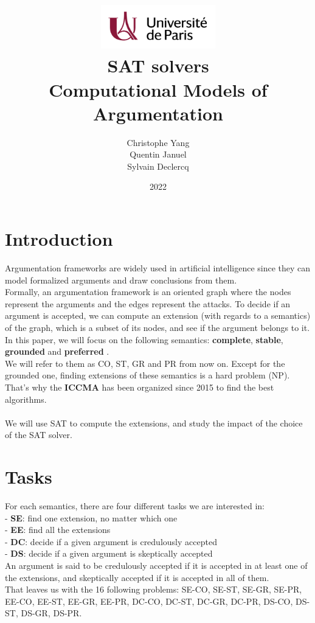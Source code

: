 \documentclass[11pt]{article}
\title{
	\centering
	\includegraphics[width=5cm]{univ-logo} \\
	\vspace{5cm}
	\textbf{SAT solvers} \\
	Computational Models of Argumentation
	\vspace{5cm}
}
\author{
    Christophe Yang \\
    Quentin Januel \\
    Sylvain Declercq
}
\date{2022}
\begin{document}
\maketitle
\newpage

\section{Introduction}
Argumentation frameworks are widely used in artificial intelligence since they can model formalized arguments and draw conclusions from them. \\
Formally, an argumentation framework is an oriented graph where the nodes represent the arguments and the edges represent the attacks. To decide if an argument is accepted, we can compute an extension (with regards to a semantics) of the graph, which is a subset of its nodes, and see if the argument belongs to it. \\
In this paper, we will focus on the following semantics: \textbf{complete}, \textbf{stable}, \textbf{grounded} and \textbf{preferred} \cite{dung1995acceptability}. \\
We will refer to them as CO, ST, GR and PR from now on.
Except for the grounded one, finding extensions of these semantics is a hard problem (NP). That's why the \textbf{ICCMA}\cite{iccma} has been organized since 2015 to find the best algorithms. \\ \\
We will use SAT to compute the extensions, and study the impact of the choice of the SAT solver.

\section{Tasks}
For each semantics, there are four different tasks we are interested in: \\
 - \textbf{SE}: find one extension, no matter which one \\
 - \textbf{EE}: find all the extensions \\
 - \textbf{DC}: decide if a given argument is credulously accepted \\
 - \textbf{DS}: decide if a given argument is skeptically accepted \\
An argument is said to be credulously accepted if it is accepted in at least one of the extensions, and skeptically accepted if it is accepted in all of them. \\
That leaves us with the 16 following problems: SE-CO, SE-ST, SE-GR, SE-PR, EE-CO, EE-ST, EE-GR, EE-PR, DC-CO, DC-ST, DC-GR, DC-PR, DS-CO, DS-ST, DS-GR, DS-PR.
\end{document}
